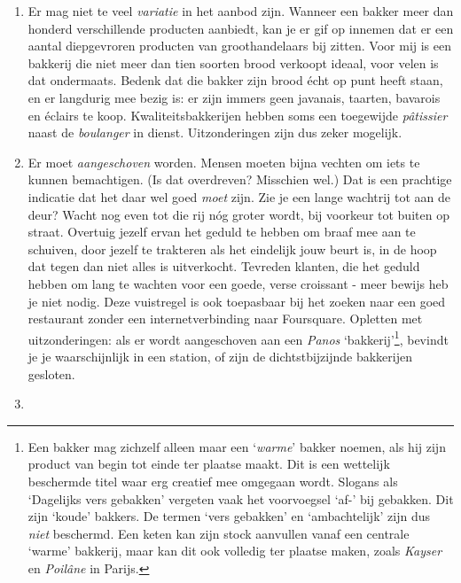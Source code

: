 \documentclass[
  11pt,
  dutch,
]{memoir}
\providecommand{\tightlist}{%
  \setlength{\itemsep}{0pt}\setlength{\parskip}{0pt}}
\begin{document}
\begin{enumerate}
\def\labelenumi{\arabic{enumi}.}
\tightlist
\item
  Er mag niet te veel \emph{variatie} in het aanbod zijn. Wanneer een
  bakker meer dan honderd verschillende producten aanbiedt, kan je er
  gif op innemen dat er een aantal diepgevroren producten van
  groothandelaars bij zitten. Voor mij is een bakkerij die niet meer dan
  tien soorten brood verkoopt ideaal, voor velen is dat ondermaats.
  \newline Bedenk dat die bakker zijn brood écht op punt heeft staan, en
  er langdurig mee bezig is: er zijn immers geen javanais, taarten,
  bavarois en éclairs te koop. Kwaliteitsbakkerijen hebben soms een
  toegewijde \emph{pâtissier} naast de \emph{boulanger} in dienst.
  Uitzonderingen zijn dus zeker mogelijk.
\item
  Er moet \emph{aangeschoven} worden. Mensen moeten bijna vechten om
  iets te kunnen bemachtigen. (Is dat overdreven? Misschien wel.) Dat is
  een prachtige indicatie dat het daar wel goed \emph{moet} zijn. Zie je
  een lange wachtrij tot aan de deur? Wacht nog even tot die rij nóg
  groter wordt, bij voorkeur tot buiten op straat. Overtuig jezelf ervan
  het geduld te hebben om braaf mee aan te schuiven, door jezelf te
  trakteren als het eindelijk jouw beurt is, in de hoop dat tegen dan
  niet alles is uitverkocht. \newline Tevreden klanten, die het geduld
  hebben om lang te wachten voor een goede, verse croissant - meer
  bewijs heb je niet nodig. Deze vuistregel is ook toepasbaar bij het
  zoeken naar een goed restaurant zonder een internetverbinding naar
  Foursquare. \newline Opletten met uitzonderingen: als er wordt
  aangeschoven aan een \emph{Panos} `bakkerij'\footnote{Een bakker mag
    zichzelf alleen maar een `\emph{warme}' bakker noemen, als hij zijn
    product van begin tot einde ter plaatse maakt. Dit is een wettelijk
    beschermde titel waar erg creatief mee omgegaan wordt. Slogans als
    `Dagelijks vers gebakken' vergeten vaak het voorvoegsel `af-' bij
    gebakken. Dit zijn `koude' bakkers. De termen `vers gebakken' en
    `ambachtelijk' zijn dus \emph{niet} beschermd. Een keten kan zijn
    stock aanvullen vanaf een centrale `warme' bakkerij, maar kan dit
    ook volledig ter plaatse maken, zoals \emph{Kayser} en
    \emph{Poilâne} in Parijs.}, bevindt je je waarschijnlijk in een
  station, of zijn de dichtstbijzijnde bakkerijen gesloten.
\item

\end{enumerate}
\end{document}
